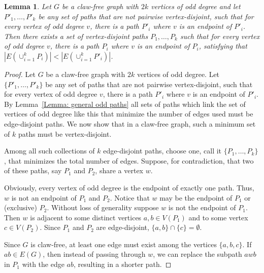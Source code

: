 \documentclass[11pt]{amsart}
\newtheorem{lemma}[theorem]{Lemma}
\theoremstyle{definition}
\begin{document}
\begin{lemma}\label{Lemma: Claw-free odd paths}
    Let $G$ be a claw-free graph with $2k$ vertices of odd degree and let $P'_1,\dots, P'_k$ 
    be any set of paths that are not pairwise vertex-disjoint, 
    such that for every vertex of odd degree $v$, there is a path $P'_i$ where $v$ is an endpoint of $P'_i$.
    Then there exists a set of vertex-disjoint paths $P_1,\dots, P_k$
    such that for every vertex of odd degree $v$, 
    there is a path $P_i$ where $v$ is an endpoint of $P_i$,
    satisfying that $|E(\cup_{i=1}^k P_i)| <  |E(\cup_{i=1}^k P'_i)| $.
\end{lemma}

\begin{proof}

    Let $G$ be a claw-free graph with  $2k$ vertices of odd degree.
    Let $\{P'_1,\dots, P'_k\}$ 
    be any set of paths that are not pairwise vertex-disjoint, 
    such that for every vertex of odd degree $v$, there is a path $P'_i$ where $v$ is an endpoint of $P'_i$.
    By Lemma~\ref{Lemma: general odd paths} all sets of paths which link the set of vertices of odd degree like this
    that minimize the number of edges used must be edge-disjoint paths.
    We now show that in a claw-free graph, such a minimum set of $k$ paths must be vertex-disjoint. 
    
    Among all such collections of $k$ edge-disjoint paths, choose one, call it $\{P_1,\dots, P_k\}$, that minimizes the total number of edges. 
    Suppose, for contradiction, that two of these paths, say $P_1$ and $P_2$, share a vertex $w$.

    Obviously,
    every vertex of odd degree is the endpoint of exactly one path.
    Thus, $w$ is not an endpoint of $P_1$ and $P_2$.
    Notice that $w$ may be the endpoint of $P_1$ or (exclusive) $P_2$.
    Without loss of generality suppose $w$ is not the endpoint of $P_1$.
    Then $w$ is adjacent to some distinct vertices $ a, b \in V(P_1) $ and to some vertex $c \in V(P_2) $. 
    Since $P_1$ and $P_2$ are edge-disjoint, $\{a,b\}\cap \{c\} = \emptyset$.

    Since $G$ is claw-free, at least one edge must exist among the vertices $\{a, b, c\}$.
   If $ab \in E(G)$, then instead of passing through $w$, we can replace the subpath $ awb $ in $P_1$ with the edge $ab$, resulting in a shorter path. 



\end{proof}
\end{document}
